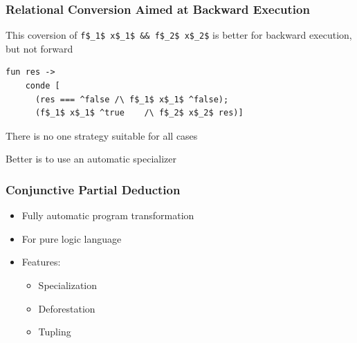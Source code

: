 \documentclass[xcolor=table]{beamer}
\begin{document}
\begin{frame}[fragile]
  \transwipe[direction=90]
  \frametitle{Relational Conversion Aimed at Backward Execution}

This coversion of  \lstinline{f$_1$ x$_1$ && f$_2$ x$_2$} is better for backward execution, but not forward

\begin{lstlisting}
fun res ->
    conde [
      (res === ^false /\ f$_1$ x$_1$ ^false);
      (f$_1$ x$_1$ ^true    /\ f$_2$ x$_2$ res)]
\end{lstlisting}


  There is no one strategy suitable for all cases
  
  \vspace{6pt} 
  
  Better is to use an automatic specializer
\end{frame}


\begin{frame}[fragile]
  \transwipe[direction=90]
  \frametitle{Conjunctive Partial Deduction}
\begin{itemize}
  \item Fully automatic program transformation
  \item For pure logic language
  \item Features: 
  \begin{itemize}
    \item Specialization
    \item Deforestation
    \item Tupling 
  \end{itemize}
\end{itemize}


\end{frame}
\end{document}
